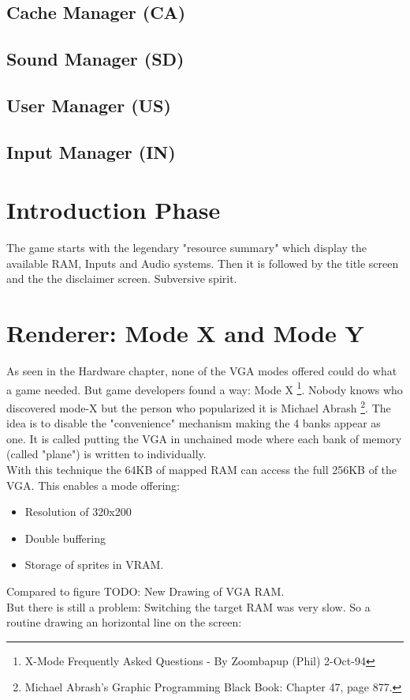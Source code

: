 \documentclass[book.tex]{subfiles}
\begin{document}
\subsection{Cache Manager (CA)}
\subsection{Sound Manager (SD)}
\subsection{User Manager (US)}
\subsection{Input Manager (IN)}

\section{Introduction Phase}
The game starts with the legendary "resource summary" which display the available RAM, Inputs and Audio systems. Then it is followed by the title screen and the the disclaimer screen. Subversive spirit.

\section{Renderer: Mode X and Mode Y}
As seen in the Hardware chapter, none of the VGA modes offered could do what a game needed. But game developers found
a way: Mode X \footnote{X-Mode Frequently Asked Questions - By Zoombapup (Phil)  2-Oct-94}. Nobody knows who discovered mode-X but the person who popularized it is Michael Abrash \footnote{Michael Abrash's Graphic Programming Black Book: Chapter 47, page 877.}. The idea is to disable the "convenience" mechanism making the 4 banks appear as one. It is called putting the VGA in unchained mode where each bank of memory (called "plane") is written to individually.\\
With this technique the 64KB of mapped RAM can access the full 256KB of the VGA. This enables a mode offering:
\begin{itemize}
	\item Resolution of 320x200
	\item Double buffering
	\item Storage of sprites in VRAM.
\end{itemize}

Compared to figure 
TODO: New Drawing of VGA RAM.\\
But there is still a problem: Switching the target RAM was very slow. So a routine drawing an horizontal line on the screen:
\end{document}
